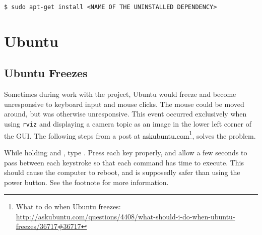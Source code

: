 \begin{verbatim}
$ sudo apt-get install <NAME OF THE UNINSTALLED DEPENDENCY>
\end{verbatim}


\section{Ubuntu}

\subsection*{Ubuntu Freezes}

Sometimes during work with the project, Ubuntu would freeze and become unresponsive to keyboard input and mouse clicks. The mouse could be moved around, but was otherwise unresponsive. This event occurred exclusively when using \texttt{rviz} and displaying a camera topic as an image in the lower left corner of the \ac{GUI}. The following steps from a post at \href{http://askubuntu.com/questions/4408/what-should-i-do-when-ubuntu-freezes/36717#36717}{askubuntu.com}\footnote{What to do when Ubuntu freezes: \url{http://askubuntu.com/questions/4408/what-should-i-do-when-ubuntu-freezes/36717\#36717}}, solves the problem.

While holding  and , type . Press each key properly, and allow a few seconds to pass between each keystroke so that each command has time to execute. This should cause the computer to reboot, and is supposedly safer than using the power button. See the footnote for more information.